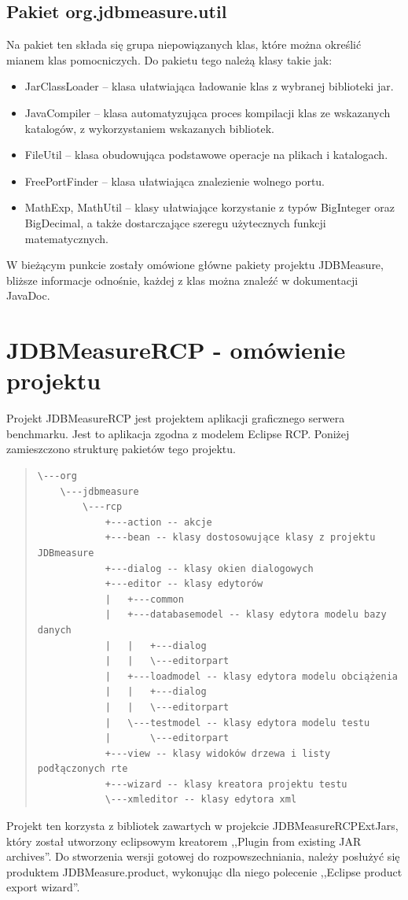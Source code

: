 \subsection{Pakiet org.jdbmeasure.util}
Na pakiet ten składa się grupa niepowiązanych klas, które można określić mianem klas pomocniczych. Do pakietu tego 
należą klasy takie jak:
\begin{itemize}
\item JarClassLoader -- klasa ułatwiająca ładowanie klas z wybranej biblioteki jar.
\item JavaCompiler -- klasa automatyzująca proces kompilacji klas ze wskazanych katalogów, z wykorzystaniem wskazanych bibliotek.
\item FileUtil -- klasa obudowująca podstawowe operacje na plikach i katalogach.
\item FreePortFinder -- klasa ułatwiająca znalezienie wolnego portu.
\item MathExp, MathUtil -- klasy ułatwiające korzystanie z typów BigInteger oraz BigDecimal, a także dostarczające szeregu użytecznych funkcji matematycznych.
\end{itemize}

W bieżącym punkcie zostały omówione główne pakiety projektu JDBMeasure, bliższe informacje 
odnośnie, każdej z klas można znaleźć w dokumentacji JavaDoc.

\section{JDBMeasureRCP - omówienie projektu}
Projekt JDBMeasureRCP jest projektem aplikacji graficznego serwera benchmarku. Jest to aplikacja 
zgodna z modelem Eclipse RCP. Poniżej zamieszczono strukturę pakietów tego projektu. 
\begin{quote}
\begin{Verbatim}
\---org
    \---jdbmeasure
        \---rcp
            +---action -- akcje
            +---bean -- klasy dostosowujące klasy z projektu JDBmeasure 
            +---dialog -- klasy okien dialogowych
            +---editor -- klasy edytorów
            |   +---common
            |   +---databasemodel -- klasy edytora modelu bazy danych
            |   |   +---dialog
            |   |   \---editorpart
            |   +---loadmodel -- klasy edytora modelu obciążenia
            |   |   +---dialog
            |   |   \---editorpart
            |   \---testmodel -- klasy edytora modelu testu
            |       \---editorpart
            +---view -- klasy widoków drzewa i listy podłączonych rte
            +---wizard -- klasy kreatora projektu testu
            \---xmleditor -- klasy edytora xml
\end{Verbatim}
\end{quote}
Projekt ten korzysta z bibliotek zawartych w projekcie JDBMeasureRCPExtJars, który został utworzony
eclipsowym kreatorem ,,Plugin from existing JAR archives''. Do stworzenia wersji gotowej do rozpowszechniania,
należy posłużyć się produktem JDBMeasure.product, wykonując dla niego polecenie ,,Eclipse product export wizard''.

